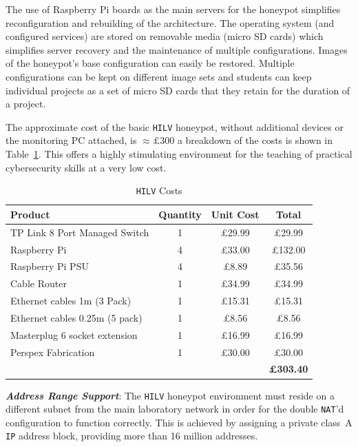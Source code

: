 \documentclass[10pt,journal]{IEEEtran}
\begin{document}
The use of Raspberry Pi boards as the main servers for the honeypot simplifies
reconfiguration and rebuilding of the architecture.  The operating system (and
configured services) are stored on removable media (micro SD cards) which
simplifies server recovery and the maintenance of multiple configurations.
Images of the honeypot's base configuration can easily be restored. Multiple
configurations can be kept on different image sets and students can keep
individual projects as a set of micro SD cards that they retain for the
duration of a project.

The approximate cost of the basic \texttt{HILV} honeypot, without additional
devices or the monitoring PC attached, is $\approx\pounds300$ a breakdown of the costs is shown in Table~\ref{table:HILVCosts}. This offers a highly
stimulating environment for the teaching of practical cybersecurity skills at a
very low cost.

\begin{table}[ht]
  \caption{\texttt{HILV} Costs\label{table:HILVCosts}}
  \begin{center}
  \begin{tabular}{| l | c | c | c |}
  \hline
  \textbf{Product} & \textbf{Quantity} & \textbf{Unit Cost} & \textbf{Total} \\
  \hline
  TP Link 8 Port Managed Switch & 1 & \pounds29.99 & \pounds29.99 \\
  \hline
  Raspberry Pi & 4 & \pounds33.00 & \pounds132.00 \\
  \hline
  Raspberry Pi PSU & 4 & \pounds8.89 & \pounds35.56 \\
  \hline
  Cable Router & 1 & \pounds34.99 & \pounds34.99 \\
  \hline
  Ethernet cables 1m (3 Pack) & 1 & \pounds15.31 & \pounds15.31 \\
  \hline
  Ethernet cables 0.25m (5 pack) & 1 & \pounds8.56 & \pounds8.56 \\
  \hline
  Masterplug 6 socket extension & 1 & \pounds16.99 & \pounds16.99 \\
  \hline
  Perspex Fabrication & 1 & \pounds30.00 & \pounds30.00 \\
  \hline
   &  &  & \large{\textbf{\pounds303.40}} \\
  \hline
  \end{tabular}
  \end{center}
  \end{table}

\noindent\textit{\textbf{Address Range Support}}:
The \texttt{HILV} honeypot environment must reside on a different subnet from
the main laboratory network in order for the double \texttt{NAT}'d
configuration to function correctly. This is achieved by assigning a private
class~A \texttt{IP} address block, providing more than 16 million addresses.
\newline\newline
\end{document}
